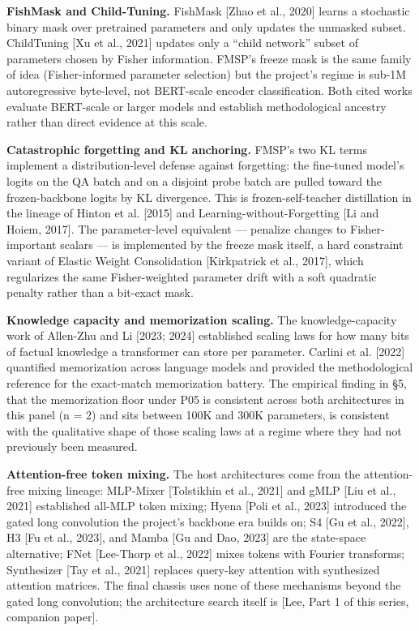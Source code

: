 \documentclass[11pt]{article}
\begin{document}
\textbf{FishMask and Child-Tuning.} FishMask [Zhao et al., 2020] learns a stochastic binary mask over pretrained parameters and only updates the unmasked subset. ChildTuning [Xu et al., 2021] updates only a ``child network'' subset of parameters chosen by Fisher information. FMSP's freeze mask is the same family of idea (Fisher-informed parameter selection) but the project's regime is sub-1M autoregressive byte-level, not BERT-scale encoder classification. Both cited works evaluate BERT-scale or larger models and establish methodological ancestry rather than direct evidence at this scale.

\textbf{Catastrophic forgetting and KL anchoring.} FMSP's two KL terms implement a distribution-level defense against forgetting: the fine-tuned model's logits on the QA batch and on a disjoint probe batch are pulled toward the frozen-backbone logits by KL divergence. This is frozen-self-teacher distillation in the lineage of Hinton et al. [2015] and Learning-without-Forgetting [Li and Hoiem, 2017]. The parameter-level equivalent --- penalize changes to Fisher-important scalars --- is implemented by the freeze mask itself, a hard constraint variant of Elastic Weight Consolidation [Kirkpatrick et al., 2017], which regularizes the same Fisher-weighted parameter drift with a soft quadratic penalty rather than a bit-exact mask.

\textbf{Knowledge capacity and memorization scaling.} The knowledge-capacity work of Allen-Zhu and Li [2023; 2024] established scaling laws for how many bits of factual knowledge a transformer can store per parameter. Carlini et al. [2022] quantified memorization across language models and provided the methodological reference for the exact-match memorization battery. The empirical finding in \S5, that the memorization floor under P05 is consistent across both architectures in this panel (n = 2) and sits between 100K and 300K parameters, is consistent with the qualitative shape of those scaling laws at a regime where they had not previously been measured.

\textbf{Attention-free token mixing.} The host architectures come from the attention-free mixing lineage: MLP-Mixer [Tolstikhin et al., 2021] and gMLP [Liu et al., 2021] established all-MLP token mixing; Hyena [Poli et al., 2023] introduced the gated long convolution the project's backbone era builds on; S4 [Gu et al., 2022], H3 [Fu et al., 2023], and Mamba [Gu and Dao, 2023] are the state-space alternative; FNet [Lee-Thorp et al., 2022] mixes tokens with Fourier transforms; Synthesizer [Tay et al., 2021] replaces query-key attention with synthesized attention matrices. The final chassis uses none of these mechanisms beyond the gated long convolution; the architecture search itself is [Lee, Part 1 of this series, companion paper].
\end{document}
